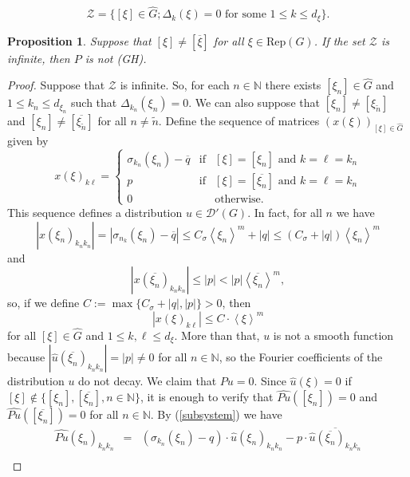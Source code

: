 \documentclass[sn-mathphys-num]{sn-jnl}%
\numberwithin{equation}{section}
\theoremstyle{thmstyleone}
\newtheorem{proposition}[theorem]{Proposition}
\theoremstyle{thmstyletwo}
\theoremstyle{thmstylethree}
\def\jp#1{{\left\langle{#1}\right\rangle}}
\begin{document}
\begin{equation}\label{setZ} 
	\mathcal{Z}=\{[\xi] \in \widehat{G}; \Delta_k(\xi)=0 \textrm{ for some } 1\leq k \leq d_\xi\}.
\end{equation}

\begin{proposition}\label{Zinfinite} Suppose that $[\xi] \neq [\overline{\xi}]$ for all $\xi \in \textrm{Rep}(G)$. If the set $\mathcal{Z}$ is infinite, then $P$ is not (GH).	
\end{proposition}  

\begin{proof} Suppose that $\mathcal{Z}$ is infinite. So, for each $n \in \mathbb{N}$ there exists $[\xi_n] \in \widehat{G}$ and $1 \leq k_n \leq d_{\xi_n}$ such that $\Delta_{k_n}(\xi_n)=0$. We can also suppose that $[\xi_n] \neq [{\xi_{\tilde{n}}}] $ and 
$[\xi_n] \neq [\overline{\xi_{\tilde{n}}}] $ for all $n \neq \tilde{n}$. Define the sequence of matrices $(x(\xi))_{[\xi] \in \widehat{G}}$ given by
$$
x(\xi)_{k\ell} = \left \{ \begin{array}{ccc} \sigma_{k_n}(\xi_n)-\overline{q} & \textrm{if} & [\xi]=[\xi_n] \textrm{ and } k=\ell=k_n \\ p & \textrm{if} & [\xi]=[\overline{\xi_n}] \textrm{ and } k=\ell=k_n \\ 0 &  & \textrm{otherwise}. \end{array}   \right.
$$
This sequence defines a distribution $u \in \mathcal{D}'(G)$. In fact, for all $n$ we have
$$|x(\xi_n)_{k_n k_n}| = |\sigma_{n_k}(\xi_n)-\overline{q}|\leq C_\sigma \jp{\xi_n}^m+|q| \leq (C_\sigma+|q|)\jp{\xi_n}^m $$
and
$$|x(\overline{\xi_n})_{k_n k_n}| \leq |p| < |p| \jp{\overline{\xi_n}}^m,$$
so, if we define $C:=\max\{C_\sigma+|q|,|p|\}>0$, then 
$$|x(\xi)_{k\ell}| \leq C\cdot \jp{\xi}^m$$
for all $[\xi]\in \widehat{G}$ and $1 \leq k,\ell \leq d_\xi$. More than that, $u$ is not a smooth function because $|\widehat{u}(\overline{\xi_n})_{k_n k_n}| = |p| \neq 0$ for all $n \in \mathbb{N}$, so the Fourier coefficients of the distribution $u$ do not decay. We claim that $Pu=0$. Since $\widehat{u}(\xi) =0$ if $[\xi] \notin \{[\xi_n],[\overline{\xi_n}], n \in \mathbb{N}\}$, it is enough to verify that $\widehat{Pu}([\xi_n])=0$ and $\widehat{Pu}([\overline{\xi_n}])=0$ for all $n \in \mathbb{N}$. By (\ref{subsystem}) we have
\begin{eqnarray*} \widehat{Pu}(\xi_n)_{k_n k_n} & = & (\sigma_{k_n}(\xi_n)-q) \cdot \widehat{u}(\xi_n)_{k_n k_n}- p \cdot \overline{\widehat{u}(\overline{\xi_n})_{k_n k_n}} \\

\end{eqnarray*}
\end{proof}
\end{document}
